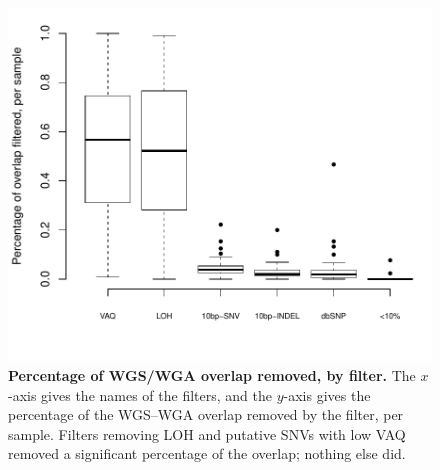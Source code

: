 \documentclass[11 pt]{article} %
\begin{document}
\begin{figure}
\centerline{
\includegraphics[width=6in]{Figure6.pdf} }
\caption{\textbf{Percentage of WGS/WGA overlap removed, by filter.} The $x$-axis gives the names of the filters, and the $y$-axis gives the percentage of the WGS--WGA overlap removed by the filter, per sample. Filters removing LOH and putative SNVs with low VAQ removed a significant percentage of the overlap; nothing else did.}
\label{fig:boxplot_percent_overlap_filtered}
\end{figure}
\end{document}
